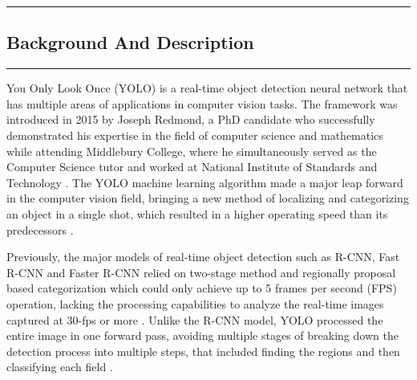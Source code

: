 {\color{gray}\hrule}
\begin{center}
\section{Background And Description}
\bigskip
\end{center}
{\color{gray}\hrule}
\begin{multicols}{2}

You Only Look Once (YOLO) is a real-time object detection neural network that has multiple areas of applications in computer vision tasks. The framework was introduced in 2015 by Joseph Redmond, a PhD candidate who successfully demonstrated his expertise in the field of computer science and mathematics while attending Middlebury College, where he simultaneously served as the Computer Science tutor and worked at National Institute of Standards and Technology \citep{redmon2016lookonceunifiedrealtime, Wallington2023}. The YOLO machine learning algorithm made a major leap forward in the computer vision field, bringing a new method of localizing and categorizing an object in a single shot, which resulted in a higher operating speed than its predecessors \citep{V7Labs2024}. 

Previously, the major models of real-time object detection such as R-CNN, Fast R-CNN and Faster R-CNN relied on two-stage method and regionally proposal based categorization which could only achieve up to 5 frames per second (FPS) operation, lacking the processing capabilities to analyze the real-time images captured at 30-fps or more \citep{7410526, PapersWithCode2024}. Unlike the R-CNN model, YOLO processed the entire image in one forward pass, avoiding multiple stages of breaking down the detection process into multiple steps, that included finding the regions and then classifying each field \citep{8627998, IBM2024}.


\end{multicols}
